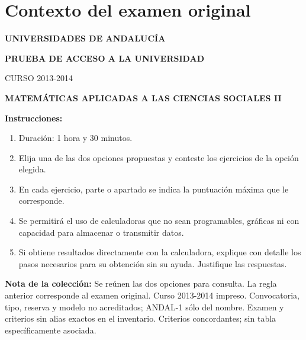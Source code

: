 \section*{Contexto del examen original}
\textbf{UNIVERSIDADES DE ANDALUCÍA}\par
\textbf{PRUEBA DE ACCESO A LA UNIVERSIDAD}\par
CURSO 2013-2014\par
\textbf{MATEMÁTICAS APLICADAS A LAS CIENCIAS SOCIALES II}

\textbf{Instrucciones:}
\begin{enumerate}[label=\textbf{\alph*)}]
  \item Duración: 1 hora y 30 minutos.
  \item Elija una de las dos opciones propuestas y conteste los ejercicios de la opción elegida.
  \item En cada ejercicio, parte o apartado se indica la puntuación máxima que le corresponde.
  \item Se permitirá el uso de calculadoras que no sean programables, gráficas ni con capacidad para almacenar o transmitir datos.
  \item Si obtiene resultados directamente con la calculadora, explique con detalle los pasos necesarios para su obtención sin su ayuda. Justifique las respuestas.
\end{enumerate}
\noindent\textbf{Nota de la colección:} Se reúnen las dos opciones para consulta. La regla anterior corresponde al examen original. Curso 2013-2014 impreso. Convocatoria, tipo, reserva y modelo no acreditados; ANDAL-1 sólo del nombre. Examen y criterios sin alias exactos en el inventario. Criterios concordantes; sin tabla específicamente asociada.
\par\medskip
